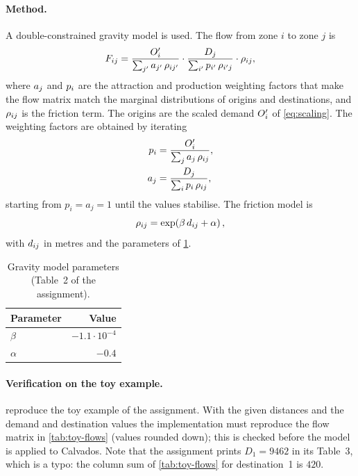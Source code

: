 \paragraph{Method.}
A double-constrained gravity model is used. The flow from zone $i$ to zone $j$ is
\begin{equation}\label{eq:gravity}
  F_{ij} = \frac{O'_i}{\sum_{j'} a_{j'}\, \rho_{ij'}} \cdot \frac{D_j}{\sum_{i'} p_{i'}\, \rho_{i'j}} \cdot \rho_{ij} ,
\end{equation}
where $a_j$ and $p_i$ are the attraction and production weighting factors that make the flow matrix match the marginal
distributions of origins and destinations, and $\rho_{ij}$ is the friction term. The origins are the scaled demand
$O'_i$ of \cref{eq:scaling}. The weighting factors are obtained by iterating
\begin{align}
  p_i &= \frac{O'_i}{\sum_j a_j\, \rho_{ij}}, \label{eq:balancing-p}\\
  a_j  &= \frac{D_j}{\sum_i p_i\, \rho_{ij}}, \label{eq:balancing-a}
\end{align}
starting from $p_i = a_j = 1$ until the values stabilise. The friction model is
\begin{equation}\label{eq:friction}
  \rho_{ij} = \exp\!\left(\beta\, d_{ij} + \alpha\right),
\end{equation}
with $d_{ij}$ in metres and the parameters of \cref{tab:gravity-parameters}.

\begin{table}[H]
  \centering
  \caption{Gravity model parameters (Table~2 of the assignment).}
  \label{tab:gravity-parameters}
  \begin{tabular}{@{}lr@{}}
    \toprule
    Parameter & Value \\
    \midrule
    $\beta$ & $-1.1\cdot 10^{-4}$ \\
    $\alpha$ & $-0.4$ \\
    \bottomrule
  \end{tabular}
\end{table}


\paragraph{Verification on the toy example.}
 reproduce the toy example of the assignment. With the given distances
and the demand and destination values the implementation must reproduce the flow matrix in \cref{tab:toy-flows} (values
rounded down); this is checked before the model is applied to Calvados. Note that the assignment prints $D_1 = 9462$ in
its Table~3, which is a typo: the column sum of \cref{tab:toy-flows} for destination~1 is $420$.

